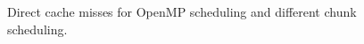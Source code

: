 \documentclass[3p,times]{elsarticle}
\begin{document}
\begin{figure}
  \qquad
  \caption{Direct cache misses for OpenMP scheduling and different chunk scheduling.}
  \label{fig:dcm}
\end{figure}
\end{document}
